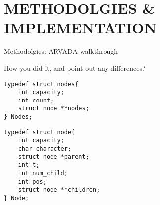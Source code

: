 \chapter{METHODOLGIES \& IMPLEMENTATION}

Methodolgies:
ARVADA walkthrough

How you did it, and point out any differences?

\begin{lstlisting}[caption={Struct used in code to store all \textit{trees}}]
typedef struct nodes{
    int capacity;
    int count;
    struct node **nodes;
} Nodes;
\end{lstlisting}

\begin{lstlisting}[caption={Struct used in \textit{trees}}]
typedef struct node{
    int capacity;
    char character;
    struct node *parent;
    int t;
    int num_child;
    int pos;
    struct node **children;
} Node;
\end{lstlisting}